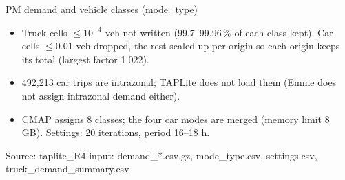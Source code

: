 \documentclass[aspectratio=169,11pt]{beamer}
\newcommand{\src}[1]{\vfill{\tiny\color{gray}Source: #1}}
\begin{document}
\begin{frame}{PM demand and vehicle classes (mode\_type)}
\small
{}
\medskip
\begin{itemize}
\item Truck cells $\le 10^{-4}$ veh not written (99.7--99.96\,\% of each class kept). Car cells $\le 0.01$ veh dropped, the rest scaled up per origin so each origin keeps its total (largest factor 1.022).
\item 492,213 car trips are intrazonal; TAPLite does not load them (Emme does not assign intrazonal demand either).
\item CMAP assigns 8 classes; the four car modes are merged (memory limit 8 GB). Settings: 20 iterations, period 16--18 h.
\end{itemize}
\src{taplite\_R4 input: demand\_*.csv.gz, mode\_type.csv, settings.csv, truck\_demand\_summary.csv}
\end{frame}
\end{document}
